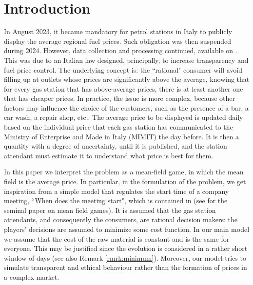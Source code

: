 \documentclass[graybox]{svmult}
\begin{document}
\section{Introduction}
\label{sec:1}
In August 2023, it became mandatory for petrol stations in Italy to publicly display the average regional fuel prices. Such obligation was then suspended during 2024. However, data collection and processing continued, available on \cite{osservaprezzi}. This was due to an Italian law designed, principally, to increase
transparency and fuel  price control. The underlying concept
is: the ``rational" consumer will avoid filling up at outlets
whose prices are significantly above the average, knowing that for every gas station that has
above-average prices, there is at least another one that has cheaper prices.
In practice, the issue is more complex, because other factors may influence the choice of the customers, such as the presence of a bar, a car wash, a repair shop, etc..
The average price to be displayed is updated daily based on the individual
price that each gas station has communicated to the Ministry of Enterprise and Made in Italy (MIMIT)
the day before. It is then a quantity with a degree of uncertainty, until it is published, and the station attendant
must estimate it to understand what price is best for them.

In this paper we interpret the problem as a mean-field game, in which the mean field is the average price. In particular, in the formulation of the problem, we get inspiration from a simple model that regulates the start time
of a company meeting, ``When does the meeting start", which is contained in \cite{liolasgue} (see \cite{laslio} for the seminal paper on mean field games). It is assumed that the
gas station attendants, and consequently the consumers, are rational decision makers: the players' decisions are assumed to minimize some cost function.
In our main model we assume that the cost of the raw material is constant and is the same for
everyone. This may be justified since the evolution  is considered in a rather short window of days (see also Remark \ref{rmrk:minimum}). Moreover, our model tries to simulate transparent and ethical behaviour rather than the formation of prices in a complex market.

\end{document}
